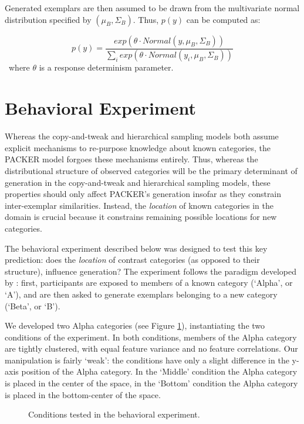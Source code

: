 \documentclass[10pt,letterpaper]{article}
\begin{document}
Generated exemplars are then assumed to be drawn from the multivariate normal distribution specified by $(\mu_{B}, \Sigma_{B})$. Thus, $p(y)$ can be computed as:

\begin{equation}
  p(y) = \dfrac
    {exp( \theta \cdot Normal(y, \mu_{B}, \Sigma_{B}))}
    {\sum_i exp( \theta \cdot Normal(y_i, \mu_{B}, \Sigma_{B}))} 
\end{equation}
\
where $\theta$ is a response determinism parameter.

\section{Behavioral Experiment}

Whereas the copy-and-tweak and hierarchical sampling models both assume explicit mechanisms to re-purpose knowledge about known categories, the PACKER model forgoes these mechanisms entirely. Thus, whereas the distributional structure of observed categories will be the primary determinant of generation in the copy-and-tweak and hierarchical sampling models, these properties should only affect PACKER's generation insofar as they constrain inter-exemplar similarities. Instead, the \textit{location} of known categories in the domain is crucial because it constrains remaining possible locations for new categories.

The behavioral experiment described below was designed to test this key prediction:  does the \textit{location} of contrast categories (as opposed to their structure), influence generation? The experiment follows the paradigm developed by \citet{jern2013probabilistic}: first, participants are exposed to members of a known category (`Alpha', or `A'), and are then asked to generate exemplars belonging to a new category (`Beta', or `B'). 

We developed two Alpha categories (see Figure \ref{fig:middle-bottom-conditions}), instantiating the two conditions of the experiment. In both conditions, members of the Alpha category are tightly clustered, with equal feature variance and no feature correlations. Our manipulation is fairly `weak': the conditions have only a slight difference in the y-axis position of the Alpha category. In the `Middle' condition the Alpha category is placed in the center of the space, in the `Bottom' condition the Alpha category is placed in the bottom-center of the space. 

\begin{figure}
    \begin{center}
    
    \caption{Conditions tested in the behavioral experiment.}
    \label{fig:middle-bottom-conditions}
    \end{center}
\end{figure}
\end{document}
